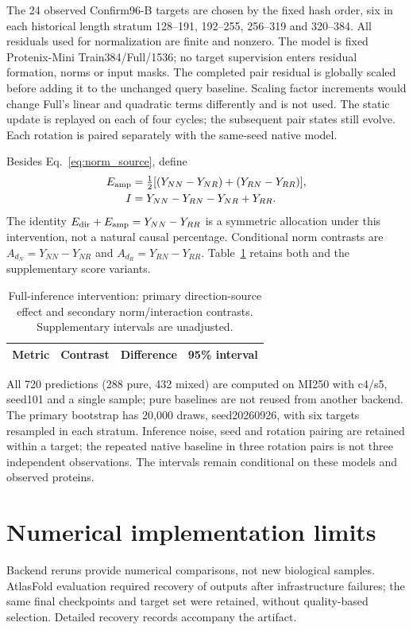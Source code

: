 The 24 observed Confirm96-B targets are chosen by the fixed hash order, six in
each historical length stratum 128--191, 192--255, 256--319 and 320--384.
All residuals used for normalization are finite and nonzero. The model is fixed
Protenix-Mini Train384/Full/1536; no target supervision enters residual formation,
norms or input masks. The completed pair residual is globally scaled before
adding it to the unchanged query baseline. Scaling factor increments would
change Full's linear and quadratic terms differently and is not used.
The static update is replayed on each of four cycles; the subsequent pair states
still evolve. Each rotation is paired separately with the same-seed native model.

Besides Eq.~\ref{eq:norm_source}, define
\begin{align}
 E_{\rm amp}&=\tfrac12[(Y_{NN}-Y_{NR})+(Y_{RN}-Y_{RR})],\\
 I&=Y_{NN}-Y_{RN}-Y_{NR}+Y_{RR}.
\end{align}
The identity $E_{\rm dir}+E_{\rm amp}=Y_{NN}-Y_{RR}$ is a symmetric allocation
under this intervention, not a natural causal percentage. Conditional norm
contrasts are $A_{d_N}=Y_{NN}-Y_{NR}$ and $A_{d_R}=Y_{RN}-Y_{RR}$.
Table~\ref{tab:cross_extra} retains both and the supplementary score variants.

\begin{table}[h]
\caption{Full-inference intervention: primary direction-source effect and
secondary norm/interaction contrasts. Supplementary intervals are unadjusted.}
\label{tab:cross_extra}\centering\small
\begin{tabular}{llrr}\toprule
Metric & Contrast & Difference & 95\% interval \\\midrule

\end{tabular}
\end{table}

All 720 predictions (288 pure, 432 mixed) are computed on MI250 with c4/s5,
seed101 and a single sample; pure baselines are not reused from another backend.
The primary bootstrap has 20,000 draws, seed20260926, with six targets resampled in each
stratum. Inference noise, seed and rotation pairing are retained within a target;
the repeated native baseline in three rotation pairs is not three independent
observations. The intervals remain conditional on these models and observed
proteins.

\section{Numerical implementation limits}
\label{app:engineering}
Backend reruns provide numerical comparisons, not new biological samples.
AtlasFold evaluation required recovery of outputs after infrastructure failures;
the same final checkpoints and target set were retained, without quality-based
selection. Detailed recovery records accompany the artifact.

